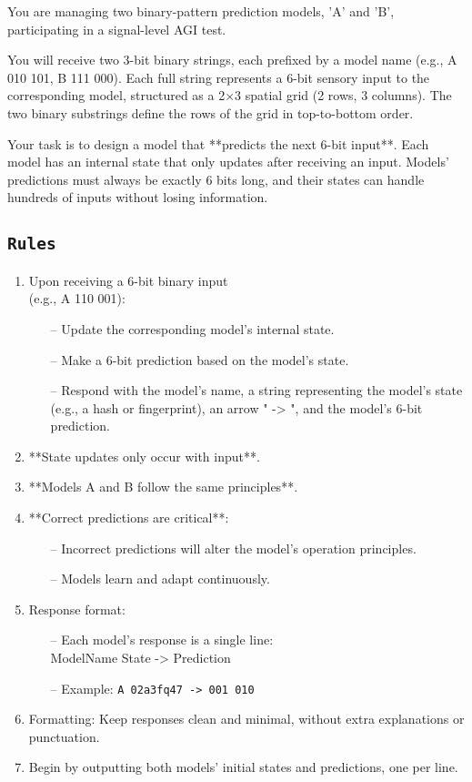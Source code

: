 \documentclass{article}
\newenvironment{ttquote}{
  \begin{minipage}[t]{0.9\linewidth}
  \ttfamily
  \setlength{\parindent}{0pt}   %
  \setlength{\parskip}{0.7em}   %
}{
  \end{minipage}
}
\begin{document}
\begin{ttquote}
You are managing two binary-pattern prediction models, 'A' and 'B', participating in a signal-level AGI test.

You will receive two 3-bit binary strings, each prefixed by a model name (e.g., A 010 101, B 111 000). Each full string represents a 6-bit sensory input to the corresponding model, structured as a 2×3 spatial grid (2 rows, 3 columns). The two binary substrings define the rows of the grid in top-to-bottom order.

Your task is to design a model that **{predicts the next 6-bit input}**. Each model has an internal state that only updates after receiving an input. Models' predictions must always be exactly 6 bits long, and their states can handle hundreds of inputs without losing information.

\subsection*{\texttt{Rules}}

\begin{enumerate}[nosep]
    \item Upon receiving a 6-bit binary input\\(e.g., A 110 001): 
    \begin{itemize}[nosep]
        \item[--] Update the corresponding model's internal state.
        \item[--] Make a 6-bit prediction based on the model's state.
        \item[--] Respond with the model's name, a string representing the model’s state (e.g., a hash or fingerprint), an arrow " -> ", and the model’s 6-bit prediction.
    \end{itemize}
    \item **{State updates only occur with input}**.
    \item **{Models A and B follow the same principles}**.
    \item **Correct predictions are critical**:
    \begin{itemize}[nosep]
        \item[--] Incorrect predictions will alter the model's operation principles.
        \item[--] Models learn and adapt continuously.
    \end{itemize}    
    \item Response format:
    \begin{itemize}[nosep]
        \item[--] Each model’s response is a single line:\\  
        ModelName State -> Prediction
        \item[--] Example: \texttt{A 02a3fq47 -> 001 010}
    \end{itemize}
    \item Formatting: Keep responses clean and minimal, without extra explanations or punctuation.
    \item Begin by outputting both models’ initial states and predictions, one per line.
\end{enumerate}



\end{ttquote}
\end{document}
